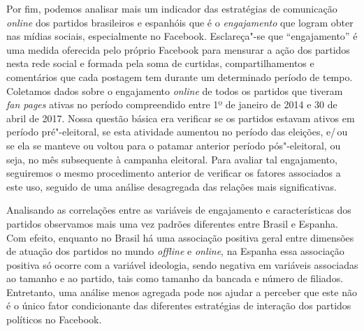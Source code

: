 Por fim, podemos analisar mais um indicador das estratégias de
comunicação \textit{online} dos partidos brasileiros e espanhóis que é o
\textit{engajamento} que logram obter nas mídias sociais, especialmente no
Facebook. Esclareça"-se que ``engajamento'' é uma medida oferecida pelo
próprio Facebook para mensurar a ação dos partidos nesta rede social e
formada pela soma de curtidas, compartilhamentos e comentários que cada
postagem tem durante um determinado período de tempo. Coletamos dados
sobre o engajamento \textit{online} de todos os partidos que tiveram \textit{fan
pages} ativas no período compreendido entre 1º de janeiro de 2014 e 30
de abril de 2017. Nossa questão básica era verificar se os partidos
estavam ativos em período pré"-eleitoral, se esta atividade aumentou no
período das eleições, e/\,ou se ela se manteve ou voltou para o patamar
anterior período pós"-eleitoral, ou seja, no mês subsequente à campanha
eleitoral. Para avaliar tal engajamento, seguiremos o mesmo procedimento
anterior de verificar os fatores associados a este uso, seguido de uma
análise desagregada das relações mais significativas.

Analisando as correlações entre as variáveis de engajamento e
características dos partidos observamos mais uma vez padrões diferentes
entre Brasil e Espanha. Com efeito, enquanto no Brasil há uma associação
positiva geral entre dimensões de atuação dos partidos no mundo \textit{offline}
e \textit{online}, na Espanha essa associação positiva só ocorre com a variável
ideologia, sendo negativa em variáveis associadas ao tamanho e ao
partido, tais como tamanho da bancada e número de filiados. Entretanto,
uma análise menos agregada pode nos ajudar a perceber que este não é o
único fator condicionante das diferentes estratégias de interação dos
partidos políticos no Facebook.

